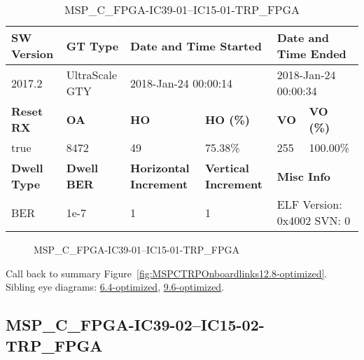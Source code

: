 \begin{table}[h]
\centering
\caption{MSP\_C\_FPGA-IC39-01--IC15-01-TRP\_FPGA}
\label{tab:MSPCFPGAIC3901IC1501TRPFPGA12.8-optimized}
\begin{tabular}{@{}|l|l|l|l|l|l|@{}}
\toprule
\textbf{SW Version}                & \textbf{GT Type}   & \multicolumn{2}{l|}{\textbf{Date and Time Started}}            & \multicolumn{2}{l|}{\textbf{Date and Time Ended}}        \\ \midrule
2017.2                       & UltraScale GTY          & \multicolumn{2}{l|}{2018-Jan-24 00:00:14}                   & \multicolumn{2}{l|}{2018-Jan-24 00:00:34}               \\ \midrule
\textbf{Reset RX}                  & \textbf{OA} & \textbf{HO}   & \textbf{HO (\%)} & \textbf{VO} & \textbf{VO (\%)} \\ \midrule
true & 8472        & 49          & 75.38\%        & 255        & 100.00\%       \\ \midrule
\textbf{Dwell Type}                & \textbf{Dwell BER} & \textbf{Horizontal Increment} & \textbf{Vertical Increment}    & \multicolumn{2}{l|}{\textbf{Misc Info}}                  \\ \midrule
BER                            & 1e-7        & 1        & 1           & \multicolumn{2}{l|}{ELF Version: 0x4002 SVN: 0}                         \\ \bottomrule
\end{tabular}
\end{table}

\begin{figure}[h]
\caption{MSP\_C\_FPGA-IC39-01--IC15-01-TRP\_FPGA} \label{fig:MSPCFPGAIC3901IC1501TRPFPGA12.8-optimized}
\end{figure}

Call back to summary Figure~\ref{fig:MSPCTRPOnboardlinks12.8-optimized}.
Sibling eye diagrams: \hyperref[sec:MSPCFPGAIC3901IC1501TRPFPGA6.4-optimized]{6.4-optimized}, \hyperref[sec:MSPCFPGAIC3901IC1501TRPFPGA9.6-optimized]{9.6-optimized}.

\clearpage
\newpage


\subsection{MSP\_C\_FPGA-IC39-02--IC15-02-TRP\_FPGA}\label{sec:MSPCFPGAIC3902IC1502TRPFPGA12.8-optimized}

